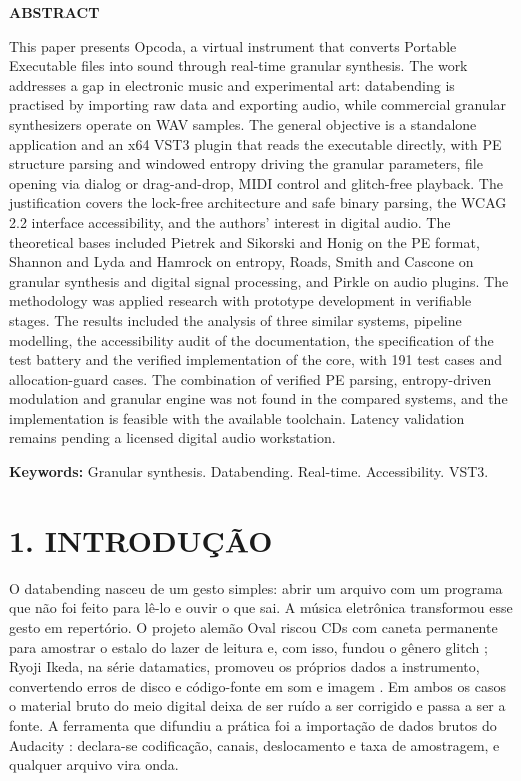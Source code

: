 \documentclass[11pt,a4paper]{article}
\begin{document}
{{\small\itshape

\noindent\textbf{ABSTRACT}\par\vspace{2pt}
\noindent This paper presents Opcoda, a virtual instrument that converts Portable Executable files into sound through real-time granular synthesis. The work addresses a gap in electronic music and experimental art: databending is practised by importing raw data and exporting audio, while commercial granular synthesizers operate on WAV samples. The general objective is a standalone application and an x64 VST3 plugin that reads the executable directly, with PE structure parsing and windowed entropy driving the granular parameters, file opening via dialog or drag-and-drop, MIDI control and glitch-free playback. The justification covers the lock-free architecture and safe binary parsing, the WCAG 2.2 interface accessibility, and the authors' interest in digital audio. The theoretical bases included Pietrek and Sikorski and Honig on the PE format, Shannon and Lyda and Hamrock on entropy, Roads, Smith and Cascone on granular synthesis and digital signal processing, and Pirkle on audio plugins. The methodology was applied research with prototype development in verifiable stages. The results included the analysis of three similar systems, pipeline modelling, the accessibility audit of the documentation, the specification of the test battery and the verified implementation of the core, with 191 test cases and allocation-guard cases. The combination of verified PE parsing, entropy-driven modulation and granular engine was not found in the compared systems, and the implementation is feasible with the available toolchain. Latency validation remains pending a licensed digital audio workstation.\par
\vspace{4pt}\noindent\textbf{Keywords:} Granular synthesis. Databending. Real-time. Accessibility. VST3.\par

}
}




\bigskip



\section*{1. INTRODUÇÃO}

O databending nasceu de um gesto simples: abrir um arquivo com um programa que não foi feito para lê-lo e ouvir o que sai. A música eletrônica transformou esse gesto em repertório. O projeto alemão Oval riscou CDs com caneta permanente para amostrar o estalo do lazer de leitura e, com isso, fundou o gênero glitch \cite{allmusicoval, pitchforkoval}; Ryoji Ikeda, na série datamatics, promoveu os próprios dados a instrumento, convertendo erros de disco e código-fonte em som e imagem \cite{ikeda2006}. Em ambos os casos o material bruto do meio digital deixa de ser ruído a ser corrigido e passa a ser a fonte. A ferramenta que difundiu a prática foi a importação de dados brutos do Audacity \cite{audacityraw}: declara-se codificação, canais, deslocamento e taxa de amostragem, e qualquer arquivo vira onda.
\end{document}
